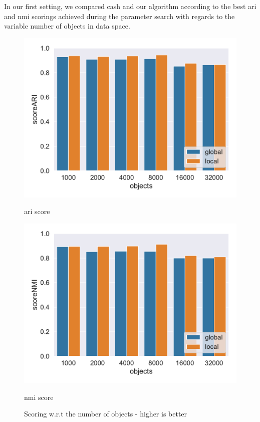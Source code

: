 In our first setting, we compared \gls{cash} and our algorithm according to the best \gls{ari} and \gls{nmi} scorings achieved during the parameter search with regards to the variable number of objects in data space. 
\begin{figure}[h]
    \centering
    \begin{minipage}[t]{.5\textwidth}
      \centering  
      \captionsetup{width=.9\linewidth}
      \includegraphics[width=\textwidth]{evaluation/per_objects/Best_ARI_3D_N5_pobjects_bar.pdf}
      \captionsetup{labelformat=empty}
      \caption{\gls{ari} score}
      \label{fig:ariperpts}
    \end{minipage}%
    \begin{minipage}[t]{.5\textwidth}
      \centering
      \captionsetup{width=.9\linewidth}
      \includegraphics[width=\textwidth]{evaluation/per_objects/Best_NMI_3D_N5_pobjects_bar.pdf}
      \captionsetup{labelformat=empty}
      \caption{\gls{nmi} score}
      \label{fig:nmiperpts}
    \end{minipage}
    \caption{Scoring w.r.t the number of objects - higher is better}
    \label{fig:scoreperpts}
\end{figure}

